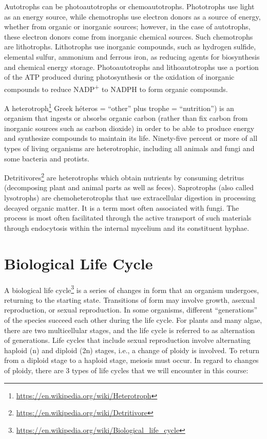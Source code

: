 \documentclass[]{book}
\let\rmarkdownfootnote\footnote%
\def\footnote{\protect\rmarkdownfootnote}
\renewcommand{\href}[2]{#2\footnote{\url{#1}}}
\theoremstyle{definition}
\theoremstyle{definition}
\theoremstyle{definition}
\theoremstyle{remark}
\begin{document}
\begin{enumerate}
Autotrophs can be photoautotrophs or chemoautotrophs. Phototrophs use
light as an energy source, while chemotrophs use electron donors as a
source of energy, whether from organic or inorganic sources; however, in
the case of autotrophs, these electron donors come from inorganic
chemical sources. Such chemotrophs are lithotrophs. Lithotrophs use
inorganic compounds, such as hydrogen sulfide, elemental sulfur,
ammonium and ferrous iron, as reducing agents for biosynthesis and
chemical energy storage. Photoautotrophs and lithoautotrophs use a
portion of the ATP produced during photosynthesis or the oxidation of
inorganic compounds to reduce NADP\textsuperscript{+} to NADPH to form organic compounds.

A \href{https://en.wikipedia.org/wiki/Heterotroph}{heterotroph} Greek
héteros = ``other'' plus trophe = ``nutrition'') is an organism that
ingests or absorbs organic carbon (rather than fix carbon from inorganic
sources such as carbon dioxide) in order to be able to produce energy
and synthesize compounds to maintain its life. Ninety-five percent or
more of all types of living organisms are heterotrophic, including all
animals and fungi and some bacteria and protists.

\href{https://en.wikipedia.org/wiki/Detritivore}{Detritivores} are
heterotrophs which obtain nutrients by consuming detritus (decomposing
plant and animal parts as well as feces). Saprotrophs (also called
lysotrophs) are chemoheterotrophs that use extracellular digestion in
processing decayed organic matter. It is a term most often associated
with fungi. The process is most often facilitated through the active
transport of such materials through endocytosis within the internal
mycelium and its constituent hyphae. 

\section{Biological Life Cycle}\label{biological-life-cycle}

A \href{https://en.wikipedia.org/wiki/Biological_life_cycle}{biological
life cycle} is a series of changes in form that an organism undergoes,
returning to the starting state. Transitions of form may involve growth,
asexual reproduction, or sexual reproduction. In some organisms,
different ``generations'' of the species succeed each other during the
life cycle. For plants and many algae, there are two multicellular
stages, and the life cycle is referred to as alternation of generations.
Life cycles that include sexual reproduction involve alternating haploid
(n) and diploid (2n) stages, i.e., a change of ploidy is involved. To
return from a diploid stage to a haploid stage, meiosis must occur. In
regard to changes of ploidy, there are 3 types of life cycles that we
will encounter in this course:


\end{enumerate}
\end{document}
